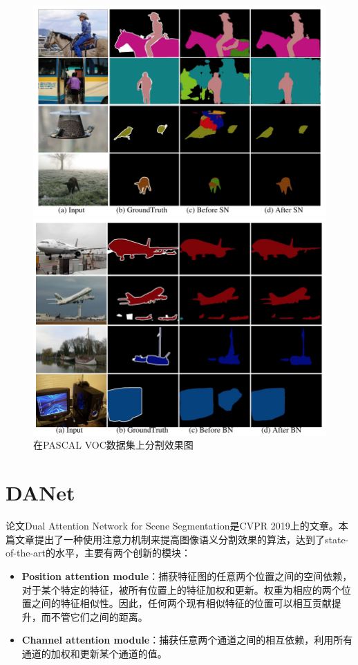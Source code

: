 \documentclass[cn]{elegantbook}
\begin{document}
\begin{figure}[!h]
	\centering
	\begin{minipage}[t]{0.48\textwidth}
		\centering
		\includegraphics[width=\textwidth]{images/dfnres3}
	\end{minipage}
	\begin{minipage}[t]{0.48\textwidth}
		\centering
		\includegraphics[width=\textwidth]{images/dfnres4}
	\end{minipage}
	\caption{\label{dfnres1}在PASCAL VOC数据集上分割效果图}
\end{figure}


\section{DANet}
论文Dual Attention Network for Scene Segmentation\cite{fu2018dual}是CVPR 2019上的文章。本篇文章提出了一种使用注意力机制来提高图像语义分割效果的算法，达到了state-of-the-art的水平，主要有两个创新的模块：
\begin{itemize}
	\item \textbf{Position attention module}：捕获特征图的任意两个位置之间的空间依赖，对于某个特定的特征，被所有位置上的特征加权和更新。权重为相应的两个位置之间的特征相似性。因此，任何两个现有相似特征的位置可以相互贡献提升，而不管它们之间的距离。
	\item \textbf{Channel attention module}：捕获任意两个通道之间的相互依赖，利用所有通道的加权和更新某个通道的值。
\end{itemize}
\end{document}
